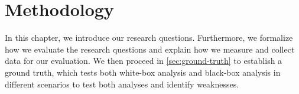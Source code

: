 \chapter{Methodology}\label{ch:methodology}

In this chapter, we introduce our research questions. 
Furthermore, we formalize how we evaluate the research questions and explain how we measure and collect data for our evaluation.
We then proceed in \autoref{sec:ground-truth} to establish a ground truth, which tests both white-box analysis and black-box analysis in 
different scenarios to test both analyses and identify weaknesses.


